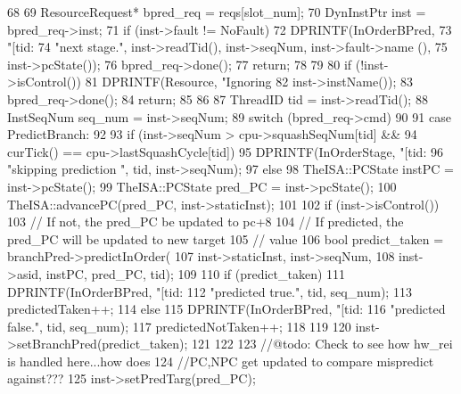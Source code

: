 \begin{DoxyCode}
68 {
69     ResourceRequest* bpred_req = reqs[slot_num];
70     DynInstPtr inst = bpred_req->inst;
71     if (inst->fault != NoFault) {
72         DPRINTF(InOrderBPred,
73                 "[tid:%
74                 "next stage.\n", inst->readTid(), inst->seqNum, inst->fault->name
      (),
75                 inst->pcState());
76         bpred_req->done();
77         return;
78     }
79 
80     if (!inst->isControl()) {
81         DPRINTF(Resource, "Ignoring %
82                 inst->instName());
83         bpred_req->done();
84         return;
85     }
86 
87     ThreadID tid = inst->readTid();
88     InstSeqNum seq_num = inst->seqNum;
89     switch (bpred_req->cmd)
90     {
91       case PredictBranch:
92         {
93             if (inst->seqNum > cpu->squashSeqNum[tid] &&
94                 curTick() == cpu->lastSquashCycle[tid]) {
95                 DPRINTF(InOrderStage, "[tid:%
96                         "skipping prediction \n", tid, inst->seqNum);
97             } else {
98                 TheISA::PCState instPC = inst->pcState();
99                 TheISA::PCState pred_PC = inst->pcState();
100                 TheISA::advancePC(pred_PC, inst->staticInst);
101 
102                 if (inst->isControl()) {
103                     // If not, the pred_PC be updated to pc+8
104                     // If predicted, the pred_PC will be updated to new target
105                     // value
106                     bool predict_taken = branchPred->predictInOrder(
107                                             inst->staticInst, inst->seqNum,
108                                             inst->asid, instPC, pred_PC, tid);
109 
110                     if (predict_taken) {
111                         DPRINTF(InOrderBPred, "[tid:%
112                                 "predicted true.\n", tid, seq_num);
113                         predictedTaken++;
114                     } else {
115                         DPRINTF(InOrderBPred, "[tid:%
116                                 "predicted false.\n", tid, seq_num);
117                         predictedNotTaken++;
118                     }
119 
120                     inst->setBranchPred(predict_taken);
121                 }
122 
123                 //@todo: Check to see how hw_rei is handled here...how does
124                 //PC,NPC get updated to compare mispredict against???
125                 inst->setPredTarg(pred_PC);
}}}}
\end{DoxyCode}
